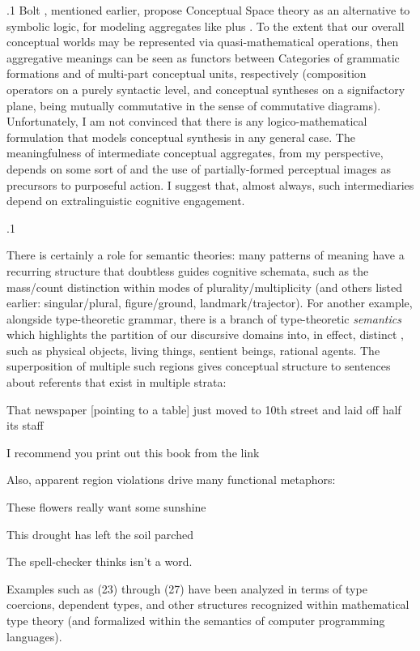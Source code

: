 \documentclass[11pt, twocolumn]{article}
\begin{document}
\p.1{%
Bolt \etal{}, mentioned earlier, propose Conceptual Space theory
as an alternative to symbolic logic, for modeling
aggregates like  plus .  To the extent that
our overall conceptual worlds may be represented via
quasi-mathematical operations, then aggregative meanings
can be seen as functors between Categories of grammatic
formations and of multi-part conceptual units, respectively
(composition operators on a purely syntactic level,
and conceptual syntheses on a signifactory plane,
being mutually commutative in the sense of
commutative diagrams).  Unfortunately, I am not
convinced that there is any logico-mathematical
formulation that models conceptual
synthesis in any general case.  The meaningfulness
of intermediate conceptual aggregates, from my
perspective, depends on some sort of
 and the use of partially-formed
perceptual images as precursors to purposeful action.
I suggest that, almost always, such intermediaries
depend on extralinguistic cognitive engagement.
} %

\p.1{%
There is certainly a role for semantic theories:
many patterns of meaning have a recurring structure
that doubtless guides cognitive schemata,
such as the mass/count distinction within modes
of plurality/multiplicity (and others listed earlier:
singular/plural, figure/ground, landmark/trajector).
For another example, alongside type-theoretic
grammar, there is a branch of type-theoretic
\textit{semantics} which highlights the partition
of our discursive domains into, in effect,
distinct , such as
physical objects, living things, sentient
beings, rational agents.  The superposition of
multiple such regions gives conceptual structure
to sentences about referents that exist in multiple strata:

\begin{exsGroup}

\exsItem{}   That newspaper [pointing to a table] just moved to 10th street
and laid off half its staff

\exsItem{}   I recommend you print out this book from the  link

\end{exsGroup}

\nip
Also, apparent region violations drive many functional metaphors:

\begin{exsGroup}

\exsItem{}   These flowers really want some sunshine

\exsItem{}   This drought has left the soil parched

\exsItem{}   The spell-checker thinks  isn't a word.

\end{exsGroup}

\nip
Examples such as \exsRef(23) through \exsRef(27) have been analyzed in terms of
type coercions, dependent types, and other structures
recognized within mathematical type theory (and
formalized within the semantics of computer programming languages).
} %
\end{document}
